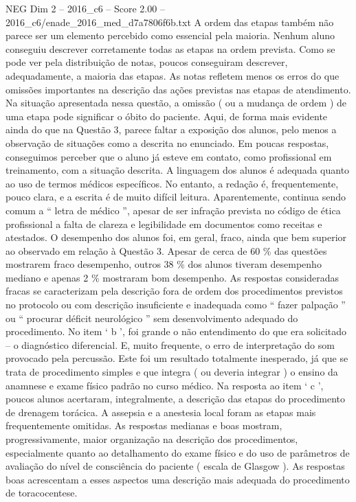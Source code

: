 \begin{textsample}{NEG Dim 2 – 2016\_c6 – Score 2.00 – 2016\_c6/enade\_2016\_med\_d7a7806f6b.txt}
A ordem das etapas também não parece ser um elemento percebido como essencial pela maioria.
Nenhum aluno conseguiu descrever corretamente todas as etapas na ordem prevista.
Como se pode ver pela distribuição de notas, poucos conseguiram descrever, adequadamente, a maioria das etapas.
As notas refletem menos os erros do que omissões importantes na descrição das ações previstas nas etapas de atendimento.
Na situação apresentada nessa questão, a omissão ( ou a mudança de ordem ) de uma etapa pode significar o óbito do paciente.
Aqui, de forma mais evidente ainda do que na Questão 3, parece faltar a exposição dos alunos, pelo menos a observação de situações como a descrita no enunciado.
Em poucas respostas, conseguimos perceber que o aluno já esteve em contato, como profissional em treinamento, com a situação descrita.
A linguagem dos alunos é adequada quanto ao uso de termos médicos específicos.
No entanto, a redação é, frequentemente, pouco clara, e a escrita é de muito difícil leitura.
Aparentemente, continua sendo comum a “ letra de médico ”, apesar de ser infração prevista no código de ética profissional a falta de clareza e legibilidade em documentos como receitas e atestados.
O desempenho dos alunos foi, em geral, fraco, ainda que bem superior ao observado em relação à Questão 3.
Apesar de cerca de 60 \% das questões mostrarem fraco desempenho, outros 38 \% dos alunos tiveram desempenho mediano e apenas 2 \% mostraram bom desempenho.
As respostas consideradas fracas se caracterizam pela descrição fora de ordem dos procedimentos previstos no protocolo ou com descrição insuficiente e inadequada como “ fazer palpação ” ou “ procurar déficit neurológico ” sem desenvolvimento adequado do procedimento.
No item ‘ b ’, foi grande o não entendimento do que era solicitado – o diagnóstico diferencial.
E, muito frequente, o erro de interpretação do som provocado pela percussão.
Este foi um resultado totalmente inesperado, já que se trata de procedimento simples e que integra ( ou deveria integrar ) o ensino da anamnese e exame físico padrão no curso médico.
Na resposta ao item ‘ c ’, poucos alunos acertaram, integralmente, a descrição das etapas do procedimento de drenagem torácica.
A assepsia e a anestesia local foram as etapas mais frequentemente omitidas.
As respostas medianas e boas mostram, progressivamente, maior organização na descrição dos procedimentos, especialmente quanto ao detalhamento do exame físico e do uso de parâmetros de avaliação do nível de consciência do paciente ( escala de Glasgow ).
As respostas boas acrescentam a esses aspectos uma descrição mais adequada do procedimento de toracocentese.

\end{textsample}
